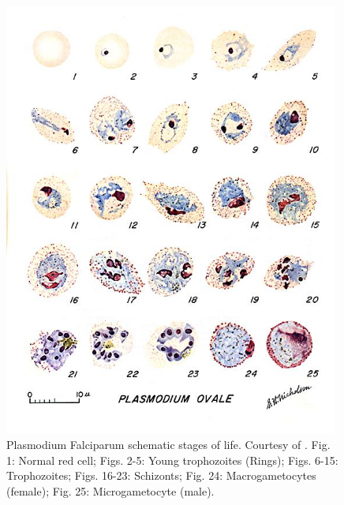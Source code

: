 \documentclass[final,a4paper,12pt,english]{UnicaPhdThesis3}
\begin{document}
\begin{figure}[!htbp]
	\centering
	\includegraphics[width=0.98\textwidth]{images/malaria_th/mal_ova}
	\caption{\label{fig:ova_th} Plasmodium Falciparum schematic stages of life. Courtesy of \cite{Med_cdc}.
	Fig. 1: Normal red cell; Figs. 2-5: Young trophozoites (Rings); Figs. 6-15: Trophozoites; 
	Figs. 16-23: Schizonts; Fig. 24: Macrogametocytes (female); Fig. 25: Microgametocyte (male).}
\end{figure}
\end{document}
